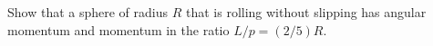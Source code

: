 Show that a sphere of radius $R$ that is rolling without
slipping has angular momentum and momentum in the ratio
$L/p=(2/5)R$.
